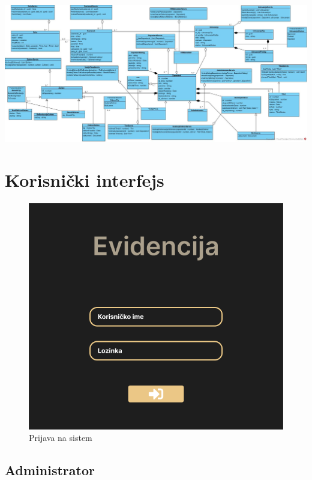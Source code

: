 \documentclass[a4paper]{article}
\begin{document}
\begin{center}
  \includegraphics[scale=0.3, angle=90]{Arhitektura/EvidencijaZaposlenihKlasniDijagram.jpg}
\end{center}

\newpage
\section{Korisnički interfejs}

\begin{figure} [!ht]
    \begin{center}
        \includegraphics[scale=0.5]{UI/LoginPage.png}
    \end{center}
\caption{Prijava na sistem}
\end{figure}

\newpage
\subsection{Administrator}
\end{document}
